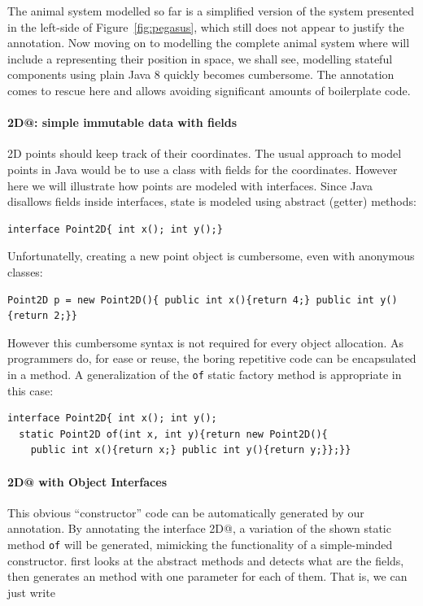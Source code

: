 The animal system modelled so far is a simplified version of the
system presented in the left-side of Figure~\ref{fig:pegasus}, which still does not appear to 
justify the \mixinAnn{} annotation.  Now moving on to modelling 
the complete animal system where \Q@Animal@s will include a \Q@location@
representing their position in space, we shall
see, modelling stateful components using plain Java 8 quickly becomes 
cumbersome. The \mixinAnn{} annotation comes to rescue here and 
allows avoiding significant amounts of boilerplate code.

\paragraph{\Q@Point2D@: simple immutable data with fields}
2D points should keep track of their coordinates.  The usual
approach to model points in Java would be to use a class with fields for the
coordinates. However here we will illustrate how points are modeled with
interfaces. Since Java disallows fields inside interfaces, state is modeled
using abstract (getter) methods:

\begin{lstlisting}
interface Point2D{ int x(); int y();}
\end{lstlisting}

\noindent Unfortunatelly, creating a new point object is cumbersome, even
with anonymous classes:

\begin{lstlisting}
Point2D p = new Point2D(){ public int x(){return 4;} public int y(){return 2;}}
\end{lstlisting}

\noindent However this cumbersome syntax is not required for every
object allocation. As programmers do, for ease or reuse, the boring
repetitive code can be encapsulated in a method. A generalization of the
\texttt{of} static factory method is appropriate in this case:
\begin{lstlisting}
interface Point2D{ int x(); int y();
  static Point2D of(int x, int y){return new Point2D(){
    public int x(){return x;} public int y(){return y;}};}}
\end{lstlisting}

\vspace{-5pt}
\paragraph{\Q@Point2D@ with Object Interfaces}
This obvious ``constructor'' code can be automatically generated by our \mixin
annotation.  By annotating the interface \Q@Point2D@, a variation of the shown
static method \texttt{of} will be generated, mimicking the functionality of a
simple-minded constructor. \mixin first looks at the abstract methods and detects
what are the fields, then generates an \Q@of@ method with one parameter for each
of them. That is, we can just write

